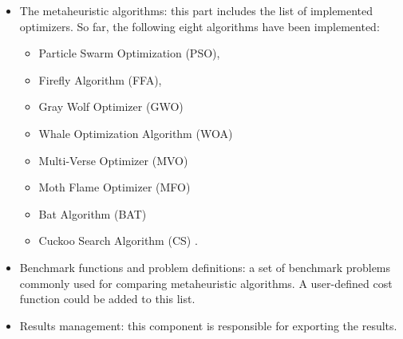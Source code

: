 \documentclass[landscape,a0paper,fontscale=0.285]{baposter} %
\newcommand{\compresslist}{ %
\setlength{\itemsep}{1pt}
\setlength{\parskip}{0pt}
\setlength{\parsep}{0pt}
}
\begin{document}
\begin{poster}
{\begin{itemize}
\item The metaheuristic algorithms: this part includes the list of implemented optimizers. So far, the following eight algorithms have been implemented: 

\begin{itemize}\compresslist
\item  Particle Swarm Optimization (PSO), 
\item  Firefly Algorithm (FFA), 
\item  Gray Wolf Optimizer (GWO)
\item  Whale Optimization Algorithm (WOA)
\item  Multi-Verse Optimizer (MVO)
\item  Moth Flame Optimizer (MFO)
\item  Bat Algorithm (BAT)
\item Cuckoo Search Algorithm (CS) .
\end{itemize}



\item Benchmark functions and problem definitions: a set of benchmark problems commonly used for comparing metaheuristic algorithms. A user-defined cost function could be added to this list.

\item Results management: this component is responsible for exporting the results.

\end{itemize}}




\end{poster}
\end{document}
